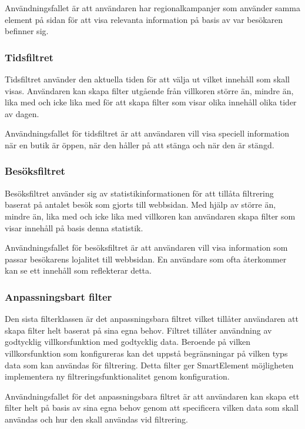 Användningsfallet är att användaren har regionalkampanjer som använder samma element på sidan för att visa relevanta information på basis av var besökaren befinner sig.

\subsubsection{Tidsfiltret}

Tidsfiltret använder den aktuella tiden för att välja ut vilket innehåll som skall visas. Användaren kan skapa filter utgående från villkoren större än, mindre än, lika med och icke lika med för att skapa filter som visar olika innehåll olika tider av dagen.

Användningsfallet för tidsfiltret är att användaren vill visa speciell information när en butik är öppen, när den håller på att stänga och när den är stängd.

\subsubsection{Besöksfiltret}

Besöksfiltret använder sig av statistikinformationen för att tillåta filtrering baserat på antalet besök som gjorts till webbsidan. Med hjälp av större än, mindre än, lika med och icke lika med villkoren kan användaren skapa filter som visar innehåll på basis denna statistik.

Användningsfallet för besöksfiltret är att användaren vill visa information som passar besökarens lojalitet till webbsidan. En användare som ofta återkommer kan se ett innehåll som reflekterar detta.

\subsubsection{Anpassningsbart filter}

Den sista filterklassen är det anpassningsbara filtret vilket tillåter användaren att skapa filter helt baserat på sina egna behov. Filtret tillåter användning av godtycklig villkorsfunktion med godtycklig data. Beroende på vilken villkorsfunktion som konfigureras kan det uppstå begränsningar på vilken typs data som kan användas för filtrering. Detta filter ger SmartElement möjligheten implementera ny filtreringsfunktionalitet genom konfiguration.

Användningsfallet för det anpassningsbara filtret är att användaren kan skapa ett filter helt på basis av sina egna behov genom att specificera vilken data som skall användas och hur den skall användas vid filtrering.

